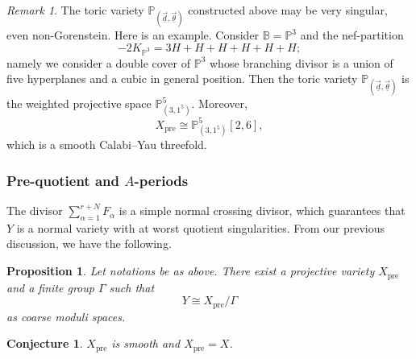 \documentclass[12pt,a4paper,oneside]{amsart}
\numberwithin{equation}{section}
\newtheorem{prop}[thm]{Proposition}
\newtheorem{cj}[thm]{Conjecture}
\theoremstyle{definition}
\theoremstyle{remark}
\newtheorem{rmk}[thm]{Remark}
\newcommand{\cP}{\mathbb{P}}
\newcommand{\Xpre}{X_{\mathrm{pre}}}
\begin{document}
\begin{rmk}
    The toric variety \( \mathbb{P}_{(\vec{\underline{d}}, \vec{\underline{\theta}})}\) constructed above may be very singular, even non-Gorenstein. Here is an example. Consider \(\mathbb{B}=\mathbb{P}^{3}\) and the nef-partition
    \begin{equation*}
        -2K_{\cP^3} = 3H + H +H+H+H+H ;
    \end{equation*}
    namely we consider a double cover of \(\mathbb{P}^{3}\)
    whose branching divisor is a union of five hyperplanes and a cubic in general position.
    Then the toric variety \(\mathbb{P}_{(\vec{\underline{d}}, \vec{\underline{\theta}})}\)
    is the weighted projective space \(\mathbb{P}^{5}_{(3,1^5)}\).
    Moreover, 
    \begin{equation*}
        \Xpre\cong\mathbb{P}^{5}_{(3,1^5)}[2,6] ,
    \end{equation*}
    which is a smooth Calabi--Yau threefold.
\end{rmk}



\subsubsection{Pre-quotient and $A$-periods}
The divisor $\sum_{\alpha=1}^{r+N} F_{\alpha}$ is a simple normal crossing divisor, which guarantees that $Y$ is a normal variety with at worst quotient singularities. 
From our previous discussion, we have the following.
\begin{prop}
    Let notations be as above.
    There exist a projective variety $\Xpre$ and a finite group $\Gamma$ such that 
    \begin{equation*}
        Y \cong \Xpre / \Gamma 
    \end{equation*}
    as coarse moduli spaces.
\end{prop}


\begin{cj}\label{conj:prequotient}
\(\Xpre\) is smooth and $\Xpre=X$.
\end{cj}
\end{document}
